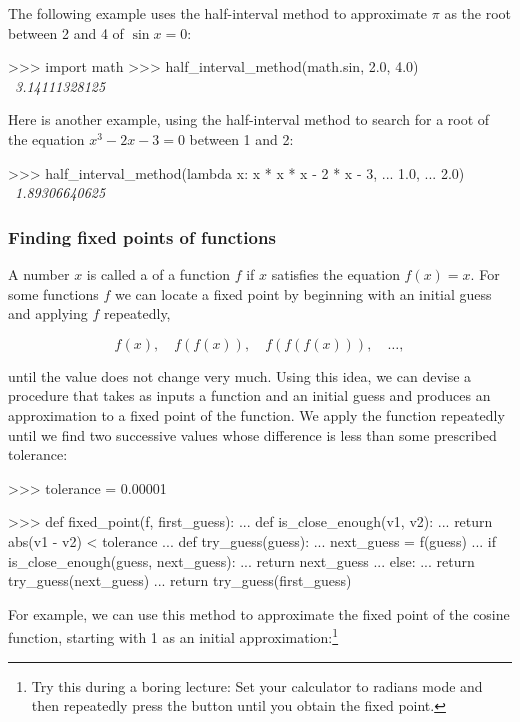 \noindent
The following example uses the half-interval method to approximate \( \pi \) as
the root between 2 and 4 of \( \sin x = 0 \):

\begin{codeBlock}
>>> import math
>>> half_interval_method(math.sin, 2.0, 4.0)
~\textit{3.14111328125}~
\end{codeBlock}

\noindent
Here is another example, using the half-interval method to search for a root of
the equation \( x^3 - 2x - 3 = 0 \) between 1 and 2:

\begin{codeBlock}
>>> half_interval_method(lambda x: x * x * x - 2 * x - 3,
...                       1.0,
...                       2.0)
~\textit{1.89306640625}~
\end{codeBlock}

\subsubsection*{Finding fixed points of functions}

A number \( x \) is called a  of a function \( f \) if \( x \)
satisfies the equation \( f(x) = x \).  For some functions \( f \) we can
locate a fixed point by beginning with an initial guess and applying \( f \)
repeatedly,

$$ f(x),\quad f(f(x)),\quad f(f(f(x))), \quad\dots, $$

\noindent
until the value does not change very much.  Using this idea, we can devise a
procedure  that takes as inputs a function and an initial
guess and produces an approximation to a fixed point of the function.  We apply
the function repeatedly until we find two successive values whose difference is
less than some prescribed tolerance:

\begin{codeBlock}
>>> tolerance = 0.00001

>>> def fixed_point(f, first_guess):
...     def is_close_enough(v1, v2):
...         return abs(v1 - v2) < tolerance
...     def try_guess(guess):
...         next_guess = f(guess)
...         if is_close_enough(guess, next_guess):
...             return next_guess
...         else:
...             return try_guess(next_guess)
...     return try_guess(first_guess)
\end{codeBlock}

\noindent
For example, we can use this method to approximate the fixed point of the
cosine function, starting with 1 as an initial approximation:\footnote{Try this
during a boring lecture: Set your calculator to radians mode and then
repeatedly press the  button until you obtain the fixed point.}

